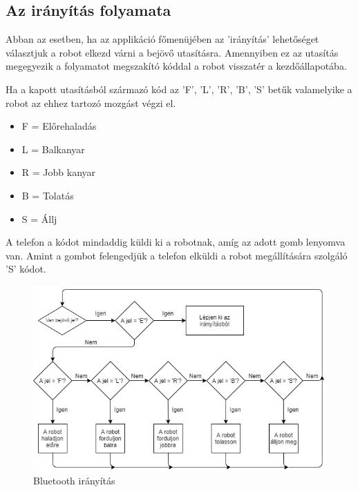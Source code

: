 \documentclass[]{thesis-ekf}
\theoremstyle{definition}
\begin{document}
\subsection{Az irányítás folyamata}\label{controlkepernyo_allapo}
Abban az esetben, ha az applikáció főmenüjében az ’irányítás’ lehetőséget választjuk a robot elkezd várni a bejövő utasításra. Amennyiben ez az utasítás megegyezik a folyamatot megszakító kóddal a robot visszatér a kezdőállapotába.

Ha a kapott utasításból származó kód az 'F', 'L', 'R', 'B', 'S' betűk valamelyike a robot az ehhez tartozó mozgást végzi el.
\begin{itemize}
	\item F = Előrehaladás
	\item L = Balkanyar
	\item R = Jobb kanyar
	\item B = Tolatás
	\item S = Állj
\end{itemize}

A telefon a kódot mindaddig küldi ki a robotnak, amíg az adott gomb lenyomva van. Amint a gombot felengedjük a telefon elküldi a robot megállítására szolgáló 'S' kódot.
\begin{figure}[h]
	\centering
	\includegraphics[width=\columnwidth]{images/grafok/iranyitas_graf}
	\caption{Bluetooth irányítás}
	\label{iranyitas_graf}
\end{figure}
\end{document}
